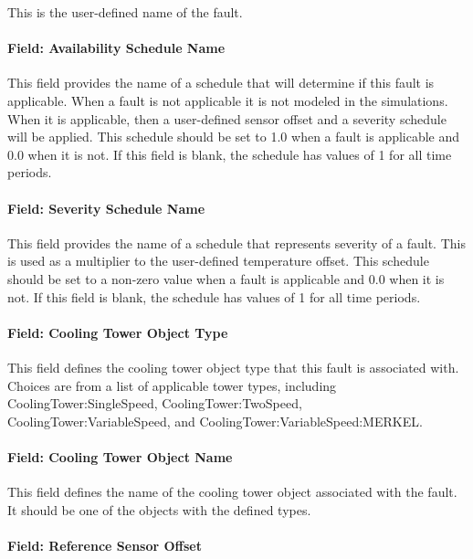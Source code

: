 This is the user-defined name of the fault.

\paragraph{Field: Availability Schedule Name}

This field provides the name of a schedule that will determine if this fault is applicable. When a fault is not applicable it is not modeled in the simulations. When it is applicable, then a user-defined sensor offset and a severity schedule will be applied. This schedule should be set to 1.0 when a fault is applicable and 0.0 when it is not. If this field is blank, the schedule has values of 1 for all time periods.

\paragraph{Field: Severity Schedule Name}\label{field-severity-schedule-name}

This field provides the name of a schedule that represents severity of a fault. This is used as a multiplier to the user-defined temperature offset. This schedule should be set to a non-zero value when a fault is applicable and 0.0 when it is not. If this field is blank, the schedule has values of 1 for all time periods.

\paragraph{Field: Cooling Tower Object Type}\label{field-tower-object-type}

This field defines the cooling tower object type that this fault is associated with. Choices are from a list of applicable tower types, including CoolingTower:SingleSpeed, CoolingTower:TwoSpeed, CoolingTower:VariableSpeed, and CoolingTower:VariableSpeed:MERKEL.

\paragraph{Field: Cooling Tower Object Name}\label{field-tower-object-name}

This field defines the name of the cooling tower object associated with the fault. It should be one of the objects with the defined types.

\paragraph{Field: Reference Sensor Offset}\label{field-reference-sensor-offset}

